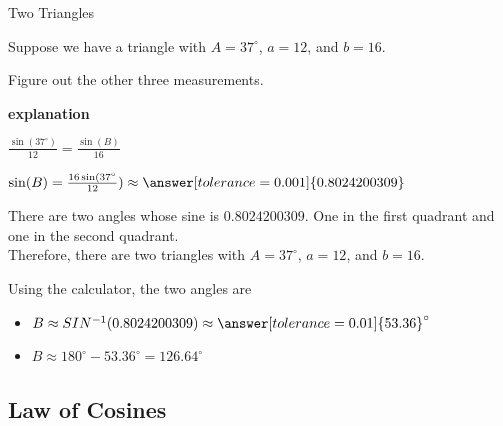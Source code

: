 \documentclass{ximera}
\begin{document}
\begin{example}  Two Triangles 


Suppose we have a triangle with $A=37^{\circ}$, $a=12$, and $b=16$.

Figure out the other three measurements.


\textbf{\textcolor{red!75!green}{explanation}} 


$\frac{\sin(37^{\circ})}{12} = \frac{\sin(B)}{16}$

$\sin(B) = \frac{16 \sin(37^{\circ}}{12}) \approx \answer[tolerance=0.001]{0.8024200309}$

There are two angles whose sine is $0.8024200309$. One in the first quadrant and one in the second quadrant. \\

Therefore, there are two triangles with $A=37^{\circ}$, $a=12$, and $b=16$. 

Using the calculator, the two angles are

\begin{itemize}
\item $B \approx SIN^{-1}(0.8024200309) \approx \answer[tolerance=0.01]{53.36}^{\circ}$
\item $B \approx 180^{\circ} - 53.36^{\circ} = 126.64^{\circ}$
\end{itemize}




\end{example}












































\subsection*{Law of Cosines}
\end{document}
